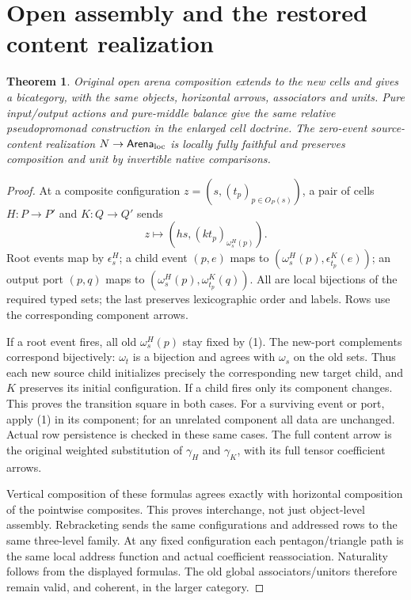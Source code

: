 \documentclass[11pt]{article}
\newtheorem{theorem}[definition]{Theorem}
\begin{document}
\section{Open assembly and the restored content realization}
\begin{theorem}
Original open arena composition extends to the new cells and gives a
bicategory, with the same objects, horizontal arrows, associators and units.
Pure input/output actions and pure-middle balance give the same relative
pseudopromonad construction in the enlarged cell doctrine.
The zero-event source-content realization $N\to\mathsf{Arena}_{\rm loc}$ is
locally fully faithful and preserves composition and unit by invertible
native comparisons.
\end{theorem}
\begin{proof}
At a composite configuration $z=(s,(t_p)_{p\in O_P(s)})$, a pair of cells
$H:P\to P'$ and $K:Q\to Q'$ sends
\[
 z\longmapsto
 (h s,(k t_p)_{\omega^H_s(p)}).
\]
Root events map by $\epsilon^H_s$; a child event $(p,e)$ maps to
$(\omega^H_s(p),\epsilon^K_{t_p}(e))$; an output port $(p,q)$ maps to
$(\omega^H_s(p),\omega^K_{t_p}(q))$.
All are local bijections of the required typed sets; the last preserves
lexicographic order and labels. Rows use the corresponding component arrows.

If a root event fires, all old $\omega^H_s(p)$ stay fixed by (1).
The new-port complements correspond bijectively: $\omega_t$ is a bijection
and agrees with $\omega_s$ on the old sets. Thus each new source child
initializes precisely the corresponding new target child, and $K$ preserves
its initial configuration. If a child fires only its component changes.
This proves the transition square in both cases. For a surviving event or
port, apply (1) in its component; for an unrelated component all data are
unchanged. Actual row persistence is checked in these same cases.
The full content arrow is the original weighted substitution of $\gamma_H$
and $\gamma_K$, with its full tensor coefficient arrows.

Vertical composition of these formulas agrees exactly with horizontal
composition of the pointwise composites. This proves interchange, not just
object-level assembly. Rebracketing sends the same configurations and
addressed rows to the same three-level family. At any fixed configuration
each pentagon/triangle path is the same local address function and actual
coefficient reassociation. Naturality follows from the displayed formulas.
The old global associators/unitors therefore remain valid, and coherent,
in the larger category.


\end{proof}
\end{document}
